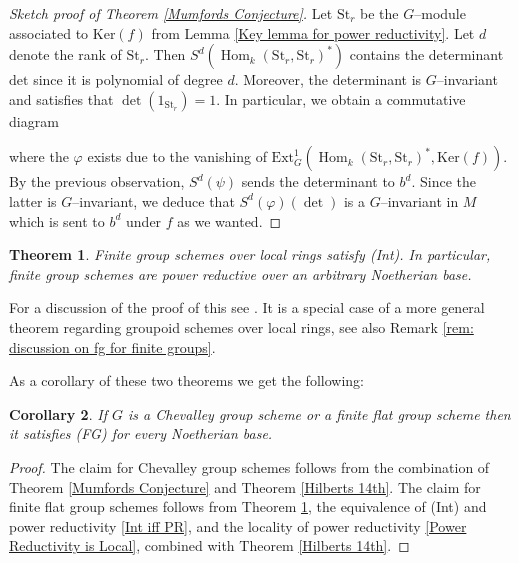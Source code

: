 \documentclass{article}
\theoremstyle{plain}
\newtheorem{Th}{Theorem}[section]
\newtheorem{Cor}[Th]{Corollary}
\theoremstyle{definition}
\DeclareMathOperator{\Hom}{Hom}
\begin{document}
\begin{proof}[Sketch proof of Theorem \ref{Mumfords Conjecture}]
    Let $\mathrm{St}_r$ be the $G$--module associated to $\mathrm{Ker}(f)$ from Lemma \ref{Key lemma for power reductivity}. Let $d$ denote the rank of $\mathrm{St}_r$. 
    Then $S^d(\Hom_k(\mathrm{St}_r,\mathrm{St}_r)^\ast)$ contains the determinant $\mathrm{det}$ since it is polynomial of degree $d$. Moreover, the determinant is $G$--invariant and satisfies that $\det(1_{\mathrm{St}_r})=1$. In particular, we obtain a commutative diagram 
    \begin{center}
    \end{center}
    where the $\varphi$ exists due to the vanishing of $\mathrm{Ext}^1_G(\Hom_k(\mathrm{St}_r,\mathrm{St}_r)^\ast,\mathrm{Ker}(f))$. By the previous observation, $S^d(\psi)$ sends the determinant to $b^{d}$.  Since the latter is $G$--invariant, we deduce that  $ S^d(\varphi)(\det)$ is a $G$--invariant in $M$ which is sent to $b^d$ under $f$ as we wanted. 
\end{proof}



\begin{Th}\label{finite over local rings}
    Finite group schemes over local rings satisfy (Int). In particular, finite group schemes are power reductive over an arbitrary Noetherian base. 
\end{Th}

For a discussion of the proof of this see \cite{van2021reductivity}. It is a special case of a more general theorem regarding groupoid schemes over local rings, see also Remark \ref{rem: discussion on fg for finite groups}.

As a corollary of these two theorems we get the following:

\begin{Cor} \label{FG for Chevalley}
    If $G$ is a Chevalley group scheme or a finite flat group scheme then it satisfies (FG) for every Noetherian base.
\end{Cor}

\begin{proof}
    The claim for Chevalley group schemes follows from the combination of Theorem \ref{Mumfords Conjecture} and Theorem \ref{Hilberts 14th}. The claim for finite flat group schemes follows from Theorem \ref{finite over local rings}, the equivalence of (Int) and power reductivity \ref{Int iff PR}, and the locality of power reductivity \ref{Power Reductivity is Local}, combined with Theorem \ref{Hilberts 14th}.
\end{proof}
\end{document}
